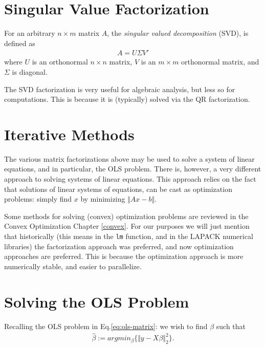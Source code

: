 \documentclass[]{book}
\theoremstyle{definition}
\theoremstyle{definition}
\theoremstyle{definition}
\theoremstyle{remark}
\let\BeginKnitrBlock\begin \let\EndKnitrBlock\end
\begin{document}
\hypertarget{singular-value-factorization}{%
\section{Singular Value Factorization}\label{singular-value-factorization}}

\BeginKnitrBlock{definition}[SVD]
\protect\hypertarget{def:svd}{}{\label{def:svd} {} }For an arbitrary \(n\times m\) matrix \(A\), the \emph{singular valued decomposition} (SVD), is defined as \begin{align}
 A = U \Sigma V' 
\end{align}
where \(U\) is an orthonormal \(n \times n\) matrix, \(V\) is an \(m \times m\) orthonormal matrix, and \(\Sigma\) is diagonal.
\EndKnitrBlock{definition}

The SVD factorization is very useful for algebraic analysis, but less so for computations.
This is because it is (typically) solved via the QR factorization.

\hypertarget{iterative-methods}{%
\section{Iterative Methods}\label{iterative-methods}}

The various matrix factorizations above may be used to solve a system of linear equations, and in particular, the OLS problem.
There is, however, a very different approach to solving systems of linear equations.
This approach relies on the fact that solutions of linear systems of equations, can be cast as optimization problems: simply find \(x\) by minimizing \(\Vert Ax-b \Vert\).

Some methods for solving (convex) optimization problems are reviewed in the Convex Optimization Chapter \ref{convex}.
For our purposes we will just mention that historically (this means in the \texttt{lm} function, and in the LAPACK numerical libraries) the factorization approach was preferred, and now optimization approaches are preferred.
This is because the optimization approach is more numerically stable, and easier to parallelize.

\hypertarget{solving-ols}{%
\section{Solving the OLS Problem}\label{solving-ols}}

Recalling the OLS problem in Eq.\eqref{eq:ols-matrix}: we wish to find \(\beta\) such that\\
\begin{align}
  \hat \beta:= argmin_\beta \{ \Vert y-X\beta \Vert^2_2 \}.
\end{align}
\end{document}
